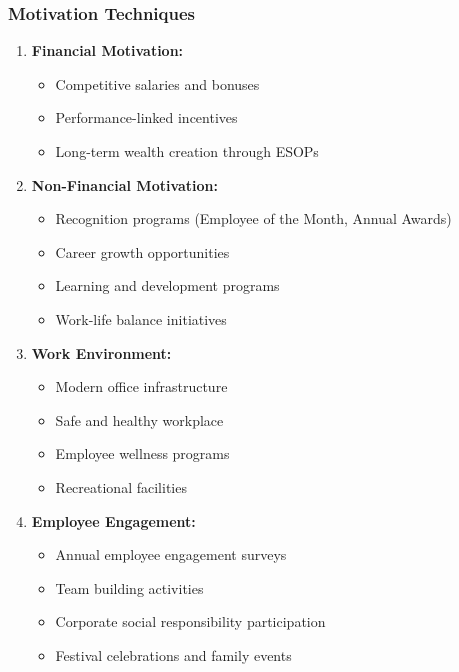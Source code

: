\documentclass[12pt,a4paper]{article}
\begin{document}
\subsubsection{Motivation Techniques}

\begin{enumerate}[leftmargin=*]
    \item \textbf{Financial Motivation:}
    \begin{itemize}
        \item Competitive salaries and bonuses
        \item Performance-linked incentives
        \item Long-term wealth creation through ESOPs
    \end{itemize}
    
    \item \textbf{Non-Financial Motivation:}
    \begin{itemize}
        \item Recognition programs (Employee of the Month, Annual Awards)
        \item Career growth opportunities
        \item Learning and development programs
        \item Work-life balance initiatives
    \end{itemize}
    
    \item \textbf{Work Environment:}
    \begin{itemize}
        \item Modern office infrastructure
        \item Safe and healthy workplace
        \item Employee wellness programs
        \item Recreational facilities
    \end{itemize}
    
    \item \textbf{Employee Engagement:}
    \begin{itemize}
        \item Annual employee engagement surveys
        \item Team building activities
        \item Corporate social responsibility participation
        \item Festival celebrations and family events
    \end{itemize}
\end{enumerate}
\end{document}
